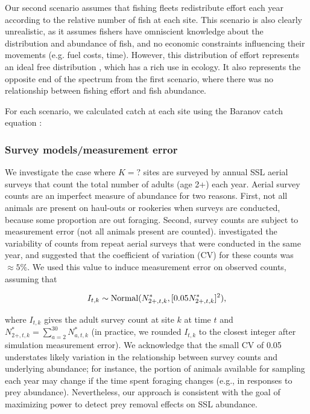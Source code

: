 \documentclass[nonumbib,leqno]{nrc1}
\begin{document}
Our second scenario assumes that fishing fleets redistribute effort each year according to the relative number of fish at each site.  This scenario is also clearly unrealistic, as it assumes fishers have omniscient knowledge about the distribution and abundance of fish, and no economic constraints influencing their movements (e.g. fuel costs, time).  However, this distribution of effort represents an ideal free distribution \citep{FretwellLucas1970}, which has a rich use in ecology.  It also represents the opposite end of the spectrum from the first scenario, where there was no relationship between fishing effort and fish abundance.

For each scenario, we calculated catch at each site using the Baranov catch equation \citep{Baranov1918}:


\subsubsection{Survey models/measurement error}

We investigate the case where $K=?$ sites are surveyed by annual SSL aerial surveys that count the total
number of adults (age 2+) each year.  Aerial survey counts are an imperfect measure of abundance for two reasons.  First, not all animals are present on haul-outs or rookeries when surveys are conducted, because some proportion are out foraging.  Second, survey counts are subject to measurement error (not all animals present are counted).  \citet{HolmesEtAl2007} investigated the variability of counts from repeat aerial surveys that were conducted in the same year, and suggested that the coefficient of variation (CV) for these counts was $\approx 5\%$.  We used this value to induce measurement error on observed counts, assuming that 
\begin{linenomath}
  \begin{equation}
     I_{t,k} \sim {\rm Normal}(N_{2+,t,k}^*,[0.05 N_{2+,t,k}^*]^2),
  \end{equation}
\end{linenomath}
where $I_{t,k}$ gives the adult survey count at site $k$ at time $t$ and $N_{2+,t,k}^*=\sum_{a=2}^30 N_{a,t,k}^*$ (in practice, we rounded $I_{t,k}$ to the closest integer after simulation measurement error).  We acknowledge that the small CV of 0.05 understates likely variation in the relationship between survey counts and underlying abundance; for instance, the portion of animals available for sampling each year may change if the time spent foraging changes (e.g., in responses to prey abundance).  Nevertheless, our approach is consistent with the goal of maximizing power to detect prey removal effects on SSL abundance.
\end{document}
